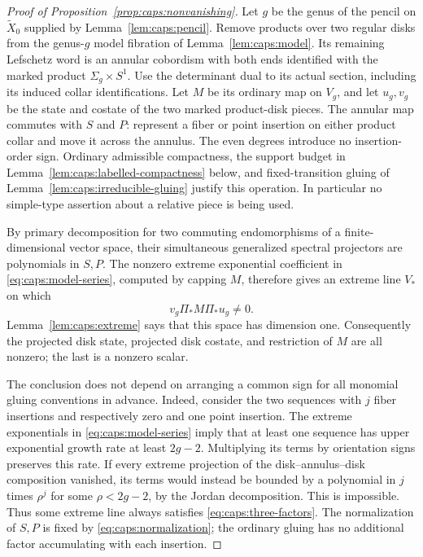 \begin{proof}[Proof of Proposition~\ref{prop:caps:nonvanishing}]
Let $g$ be the genus of the pencil on $\widetilde X_0$ supplied by
Lemma~\ref{lem:caps:pencil}.  Remove products over two regular disks
from the genus-$g$ model fibration of
Lemma~\ref{lem:caps:model}.  Its remaining Lefschetz word is an annular
cobordism with both ends identified with the marked product
$\Sigma_g\times S^1$.  Use the determinant dual to its actual section,
including its induced collar identifications.  Let $M$ be its ordinary
map on $V_g$, and let $u_g,v_g$ be the state and costate of the two marked
product-disk pieces.  The annular map commutes with $S$ and $P$:
represent a fiber or point insertion on either product collar and move
it across the annulus.  The even degrees introduce no insertion-order
sign.  Ordinary admissible compactness, the support budget in
Lemma~\ref{lem:caps:labelled-compactness} below, and fixed-transition
gluing of Lemma~\ref{lem:caps:irreducible-gluing} justify this operation.
In particular no simple-type assertion about a relative piece is being
used.

By primary decomposition for two commuting endomorphisms of a
finite-dimensional vector space, their simultaneous generalized spectral
projectors are polynomials in $S,P$.  The nonzero extreme exponential
coefficient in \eqref{eq:caps:model-series}, computed by capping $M$,
therefore gives an extreme line $V_*$ on which
\begin{equation}\label{eq:caps:three-factors}
                    v_g\Pi_*M\Pi_*u_g\ne0.
\end{equation}
Lemma~\ref{lem:caps:extreme} says that this space has dimension one.
Consequently the projected disk state, projected disk costate, and
restriction of $M$ are all nonzero; the last is a nonzero scalar.

The conclusion does not depend on arranging a common sign for all
monomial gluing conventions in advance.  Indeed, consider the two
sequences with $j$ fiber insertions and respectively zero and one point
insertion.  The extreme exponentials in \eqref{eq:caps:model-series}
imply that at least one sequence has upper exponential growth rate at
least $2g-2$.  Multiplying its terms by orientation signs preserves this
rate.  If every extreme projection of the disk--annulus--disk composition
vanished, its terms would instead be bounded by a polynomial in $j$
times $\rho^j$ for some $\rho<2g-2$, by the Jordan decomposition.
This is impossible.  Thus some extreme line always satisfies
\eqref{eq:caps:three-factors}.  The normalization of $S,P$ is fixed by
\eqref{eq:caps:normalization}; the ordinary gluing has no additional
factor accumulating with each insertion.


\end{proof}
